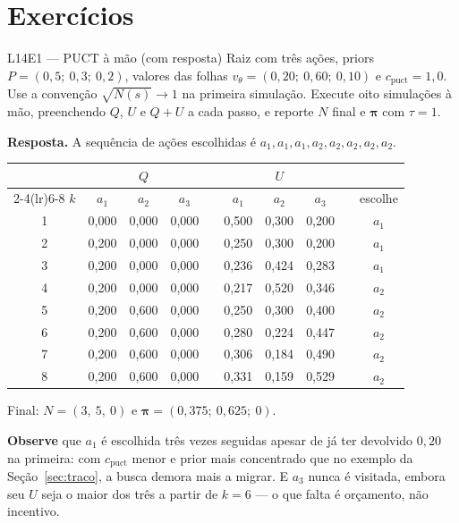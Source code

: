 \documentclass[11pt]{article}
\newcommand{\cpuct}{c_{\mathrm{puct}}}
\newcommand{\Nvis}{N}
\newcommand{\redeval}{v_{\theta}}
\newcommand{\raizpol}{\bm{\pi}}
\begin{document}
\section{Exercícios}

\begin{exbox}{L14E1 — PUCT à mão \normalfont(com resposta)}
Raiz com três ações, priors $P = (0{,}5;\ 0{,}3;\ 0{,}2)$, valores das folhas
$\redeval = (0{,}20;\ 0{,}60;\ 0{,}10)$ e $\cpuct = 1{,}0$. Use a convenção
$\sqrt{\Nvis(s)} \to 1$ na primeira simulação. Execute oito simulações à mão,
preenchendo $Q$, $U$ e $Q+U$ a cada passo, e reporte $\Nvis$ final e
$\raizpol$ com $\tau = 1$.
\end{exbox}

\begin{provabox}
\textbf{Resposta.} A sequência de ações escolhidas é
$a_1, a_1, a_1, a_2, a_2, a_2, a_2, a_2$.

\begin{center}
\small
\begin{tabular}{c ccc c ccc c c}
\toprule
& \multicolumn{3}{c}{$Q$} && \multicolumn{3}{c}{$U$} && \\
\cmidrule(lr){2-4}\cmidrule(lr){6-8}
$k$ & $a_1$ & $a_2$ & $a_3$ && $a_1$ & $a_2$ & $a_3$ && escolhe \\
\midrule
1 & 0,000 & 0,000 & 0,000 && 0,500 & 0,300 & 0,200 && $a_1$ \\
2 & 0,200 & 0,000 & 0,000 && 0,250 & 0,300 & 0,200 && $a_1$ \\
3 & 0,200 & 0,000 & 0,000 && 0,236 & 0,424 & 0,283 && $a_1$ \\
4 & 0,200 & 0,000 & 0,000 && 0,217 & 0,520 & 0,346 && $a_2$ \\
5 & 0,200 & 0,600 & 0,000 && 0,250 & 0,300 & 0,400 && $a_2$ \\
6 & 0,200 & 0,600 & 0,000 && 0,280 & 0,224 & 0,447 && $a_2$ \\
7 & 0,200 & 0,600 & 0,000 && 0,306 & 0,184 & 0,490 && $a_2$ \\
8 & 0,200 & 0,600 & 0,000 && 0,331 & 0,159 & 0,529 && $a_2$ \\
\bottomrule
\end{tabular}
\end{center}

Final: $\Nvis = (3,\ 5,\ 0)$ e $\raizpol = (0{,}375;\ 0{,}625;\ 0)$.

\textbf{Observe} que $a_1$ é escolhida três vezes seguidas apesar de já ter
devolvido $0{,}20$ na primeira: com $\cpuct$ menor e prior mais concentrado que no
exemplo da Seção~\ref{sec:traco}, a busca demora mais a migrar. E $a_3$ nunca é
visitada, embora seu $U$ seja o maior dos três a partir de $k=6$ — o que falta é
orçamento, não incentivo.
\end{provabox}
\end{document}
